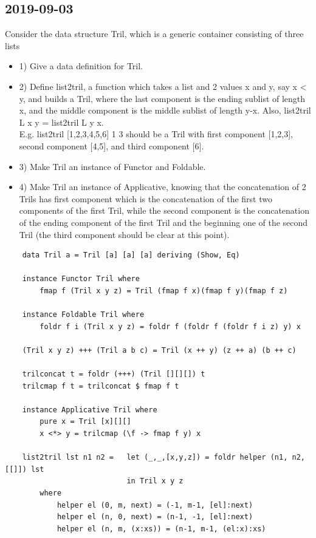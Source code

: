 \subsection{2019-09-03}
Consider the data structure Tril, which is a generic container consisting of three lists
\begin{itemize}
    \item 1) Give a data definition for Tril.
    \item 2) Define list2tril, a function which takes a list and 2 values x and y, say x < y, and builds a Tril, where the last component is the ending sublist of length x, and the middle component is the middle sublist of length y-x. Also, list2tril L x y = list2tril L y x. \\ E.g. list2tril [1,2,3,4,5,6] 1 3 should be a Tril with first component [1,2,3], second component [4,5], and third component [6].
    \item 3) Make Tril an instance of Functor and Foldable.
    \item 4) Make Tril an instance of Applicative, knowing that the concatenation of 2 Trils has first component which is the concatenation of the first two components of the first Tril, while the second component is the concatenation of the ending component of the first Tril and the beginning one of the second Tril (the third component should be clear at this point).
\end{itemize}
\begin{lstlisting}
    data Tril a = Tril [a] [a] [a] deriving (Show, Eq)

    instance Functor Tril where
        fmap f (Tril x y z) = Tril (fmap f x)(fmap f y)(fmap f z)

    instance Foldable Tril where
        foldr f i (Tril x y z) = foldr f (foldr f (foldr f i z) y) x
    
    (Tril x y z) +++ (Tril a b c) = Tril (x ++ y) (z ++ a) (b ++ c)

    trilconcat t = foldr (+++) (Tril [][][]) t
    trilcmap f t = trilconcat $ fmap f t

    instance Applicative Tril where
        pure x = Tril [x][][]
        x <*> y = trilcmap (\f -> fmap f y) x

    list2tril lst n1 n2 =   let (_,_,[x,y,z]) = foldr helper (n1, n2, [[]]) lst
                            in Tril x y z
        where
            helper el (0, m, next) = (-1, m-1, [el]:next)
            helper el (n, 0, next) = (n-1, -1, [el]:next)
            helper el (n, m, (x:xs)) = (n-1, m-1, (el:x):xs)
\end{lstlisting}




